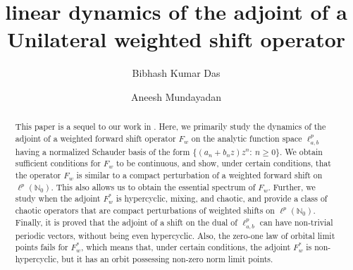 \documentclass[12pt, reqno]{amsart}
\theoremstyle{definition}
\theoremstyle{remark}
\numberwithin{equation}{section}
\begin{document}

\setcounter{page}{1}

\title[Dynamics]{linear dynamics of the adjoint of a Unilateral {weighted shift operator}}

\author[Das]{Bibhash Kumar Das}
\address{Indian Institute of Technology Bhubaneswar, Jatni Rd, Khordha - 752050, India}

\author[Mundayadan]{Aneesh Mundayadan}
\address{Indian Institute of Technology Bhubaneswar, Jatni Rd, Khordha - 752050, India}







\begin{abstract}
This paper is a sequel to our work in \cite{Das-Mundayadan}. Here, we primarily study the dynamics of the adjoint of a  weighted forward shift operator $F_w$ on the analytic function space $\ell^p_{a,b}$ having a normalized Schauder basis of the form $\{(a_n+b_nz)z^n:~n \geq 0\}$. We obtain sufficient conditions for $F_w$ to be continuous, and show, under certain conditions, that the operator $F_w$ is similar to a compact perturbation of a weighted forward shift on $\ell^p(\mathbb{N}_0)$. This also allows us to obtain the essential spectrum of $F_w$. Further, we study when the adjoint $F_w^*$ is hypercyclic, mixing, and chaotic, and provide a class of chaotic operators that are compact perturbations of weighted shifts on $\ell^p(\mathbb{N}_0)$. Finally, it is proved that the adjoint of a shift on the dual of $\ell^p_{a,b}$ can have non-trivial periodic vectors, without being even hypercyclic. Also, the zero-one law of orbital limit points fails for $F_w^*$, which means that, under certain conditions, the adjoint $F_w^*$ is non-hypercyclic, but it has an orbit possessing non-zero norm limit points.
\end{abstract}
\maketitle

\noindent
\tableofcontents
\end{document}
